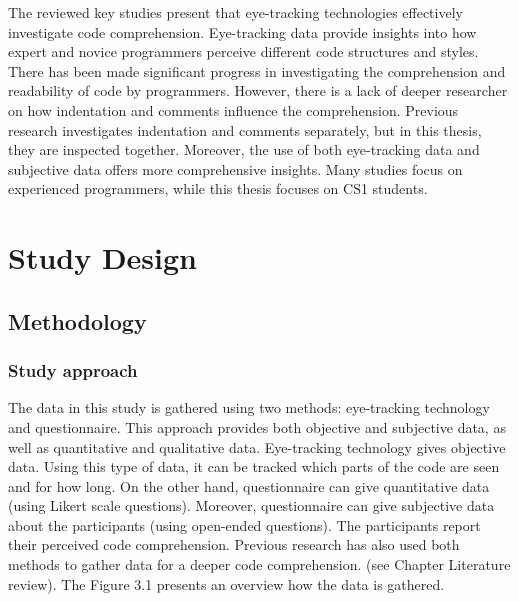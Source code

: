 The reviewed key studies present that eye-tracking technologies effectively investigate code comprehension.  Eye-tracking data provide insights into how expert and novice programmers perceive different code structures and styles. There has been made significant progress in investigating the comprehension and readability of code by programmers.  However, there is a lack of deeper researcher on how indentation and comments influence the comprehension.  Previous research investigates indentation and comments separately, but in this thesis, they are inspected together. Moreover, the use of both eye-tracking data and subjective data offers more comprehensive insights. Many studies focus on experienced programmers, while this thesis focuses on CS1 students. 





\chapter{Study Design}



\section{Methodology}

\subsection{Study approach} The data in this study is gathered using two methods: eye-tracking technology and questionnaire. This approach provides both objective and subjective data, as well as quantitative and qualitative data.
Eye-tracking technology gives objective data. Using this type of data, it can be tracked which parts of the code are seen and for how long. On the other hand, questionnaire can give quantitative data (using Likert scale questions). Moreover, questionnaire can give subjective data about the participants (using open-ended questions). The participants report their perceived code comprehension.  
Previous research has also used both methods to gather data for a deeper code comprehension. (see Chapter Literature review). The Figure 3.1 presents an overview how the data is gathered. 



